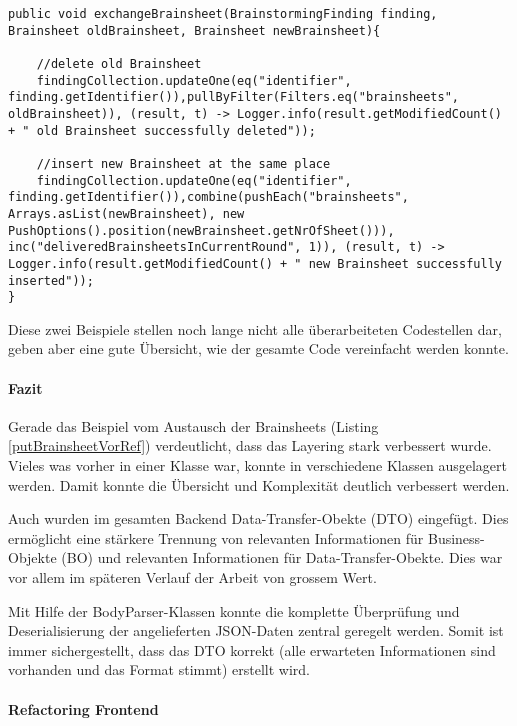 \begin{lstlisting}[caption={Exchange Brainsheet im Data Access Layer}, label=exchangeBrainsheetDAL]
public void exchangeBrainsheet(BrainstormingFinding finding, Brainsheet oldBrainsheet, Brainsheet newBrainsheet){
    
    //delete old Brainsheet
    findingCollection.updateOne(eq("identifier", finding.getIdentifier()),pullByFilter(Filters.eq("brainsheets", oldBrainsheet)), (result, t) -> Logger.info(result.getModifiedCount() + " old Brainsheet successfully deleted"));
    
    //insert new Brainsheet at the same place
    findingCollection.updateOne(eq("identifier", finding.getIdentifier()),combine(pushEach("brainsheets", Arrays.asList(newBrainsheet), new PushOptions().position(newBrainsheet.getNrOfSheet())), inc("deliveredBrainsheetsInCurrentRound", 1)), (result, t) -> Logger.info(result.getModifiedCount() + " new Brainsheet successfully inserted"));
}
\end{lstlisting}
Diese zwei Beispiele stellen noch lange nicht alle überarbeiteten Codestellen dar, geben aber eine gute Übersicht, wie der gesamte Code vereinfacht werden konnte.

\paragraph*{Fazit}
Gerade das Beispiel vom Austausch der Brainsheets (Listing \ref{putBrainsheetVorRef}) verdeutlicht, dass das Layering stark verbessert wurde. Vieles was vorher in einer Klasse war, konnte in verschiedene Klassen ausgelagert werden. Damit konnte die Übersicht und Komplexität deutlich verbessert werden.

Auch wurden im gesamten Backend Data-Transfer-Obekte (DTO) \cite{DTO} eingefügt. Dies ermöglicht eine stärkere Trennung von relevanten Informationen für Business-Objekte (BO) und relevanten Informationen für Data-Transfer-Obekte. Dies war vor allem im späteren Verlauf der Arbeit von grossem Wert.

Mit Hilfe der BodyParser-Klassen konnte die komplette Überprüfung und Deserialisierung der angelieferten JSON-Daten zentral geregelt werden. Somit ist immer sichergestellt, dass das DTO korrekt (alle erwarteten Informationen sind vorhanden und das Format stimmt) erstellt wird. 

\paragraph*{Refactoring Frontend}~\\

